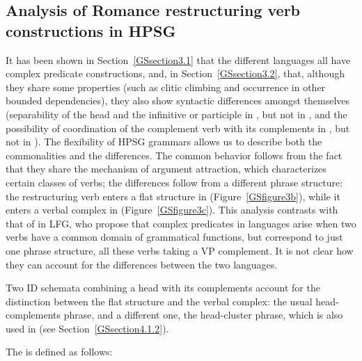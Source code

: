 \subsection{Analysis of Romance restructuring verb constructions in HPSG} \label{GSsection3.3}
\label{sec-romance-complex-predicates}

It has been shown in Section~\ref{GSsection3.1} that the different  languages all have
complex predicate constructions, and, in Section~\ref{GSsection3.2}, that, although they share some
properties (such as clitic climbing and occurrence in other bounded dependencies), they also show syntactic differences amongst themselves (separability of the head and the infinitive or participle in , but not in , and the possibility of coordination of the complement verb with its complements in , but not in ). The flexibility of HPSG grammars allows us to describe both the commonalities and the differences. The common behavior follows from the fact that they share the mechanism of argument attraction, which characterizes certain classes of verbs; the differences follow from a different phrase structure: the restructuring verb enters a flat structure in  (Figure~\ref{GSfigure3b}), while it enters a verbal complex in  (Figure~\ref{GSfigure3c}). This analysis contrasts with that of \citet{andrews1999complex} in LFG, who propose that complex predicates in  languages arise when two verbs have a common domain of grammatical functions, but correspond to just one phrase structure, all these verbs taking a VP complement. It is not clear how they can account for the differences between the two languages.

Two ID schemata combining a head with its complements account for the distinction between the flat structure and the verbal complex: the usual head-complements phrase, and a different one, the head-cluster phrase, which is also used in  (see Section~\ref{GSsection4.1.2}).

The  is defined as follows:

